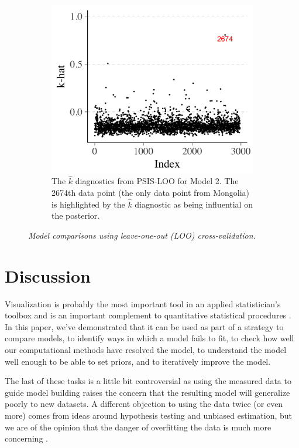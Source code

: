 \documentclass{statsoc}
\begin{document}
\begin{figure}
\begin{subfigure}{0.48\textwidth}
\includegraphics[width=\textwidth]{loo_khat.png}
\caption{The $\hat{k}$ diagnostics from PSIS-LOO for Model 2. The 2674th data
point (the only data point from Mongolia) is highlighted by the $\hat{k}$
diagnostic as being influential on the posterior.}
\label{fig:loo_khat}
\end{subfigure}
\caption{\it Model comparisons using leave-one-out (LOO) cross-validation.}
\end{figure}



\section{Discussion}

Visualization is probably the most important tool in an applied statistician's
toolbox and is an important complement to quantitative statistical procedures \citep{buja2009statistical}.
In this paper, we've demonstrated that it can be used as part of a strategy to
compare models, to identify ways in which a model fails to fit, to check how
well our computational methods have resolved the model, to understand the model
well enough to be able to set priors, and to iteratively improve the model.

The last of these tasks is a little bit controversial as using the measured data
to guide model building raises the concern that the resulting model will
generalize poorly to new datasets. A different objection to using the data twice
(or even more) comes from ideas around hypothesis testing and unbiased
estimation, but we are of the opinion that the danger of overfitting the data is
much more concerning \citep{gelman2014statistical}.
\end{document}
